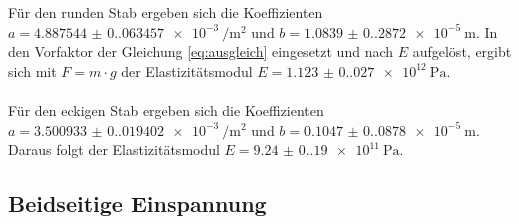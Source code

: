 Für den runden Stab ergeben sich  die Koeffizienten $a = \SI{4.887544(0.063457)e-3}{\per\meter\squared}$ und $b = \SI{1.0839(0.2872)e-5}{\meter}$.
In den Vorfaktor der Gleichung \eqref{eq:ausgleich} eingesetzt und nach $E$ aufgelöst,
ergibt sich mit $F = m \cdot g$ der Elastizitätsmodul $E = \SI{1.123(0.027)e12}{\pascal}.$\\
\\
Für den eckigen Stab ergeben sich die Koeffizienten \\$a = \SI{3.500933(0.019402)e-3}{\per\meter\squared}$ und $b = \SI{0.1047(0.0878)e-5}{\meter}$.
Daraus folgt der Elastizitätsmodul $E = \SI{9.24(0.19)e11}{\pascal}.$


\newpage
\subsection{Beidseitige Einspannung}
